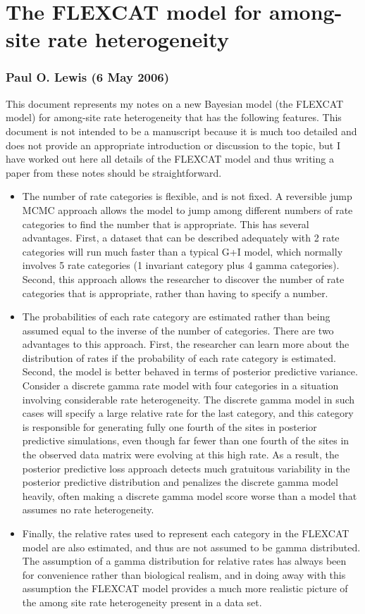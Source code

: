 \documentclass[12pt]{article}
\begin{document}
\section{The FLEXCAT model for among-site rate heterogeneity}
\subsubsection{Paul O. Lewis (6 May 2006)}

This document represents my notes on a new Bayesian model (the FLEXCAT model) for among-site rate heterogeneity that has the following features. This document is not intended to be a manuscript because it is much too detailed and does not provide an appropriate introduction or discussion to the topic, but I have worked out here all details of the FLEXCAT model and thus writing a paper from these notes should be straightforward.

\begin{itemize}
\item The number of rate categories is flexible, and is not fixed. A reversible jump MCMC approach allows the model to jump among different numbers of rate categories to find the number that is appropriate. This has several advantages. First, a dataset that can be described adequately with 2 rate categories will run much faster than a typical G+I model, which normally involves 5 rate categories (1 invariant category plus 4 gamma categories). Second, this approach allows the researcher to discover the number of rate categories that is appropriate, rather than having to specify a number.
\item The probabilities of each rate category are estimated rather than being assumed equal to the inverse of the number of categories. There are two advantages to this approach. First, the researcher can learn more about the distribution of rates if the probability of each rate category is estimated. Second, the model is better behaved in terms of posterior predictive variance. Consider a discrete gamma rate model with four categories in a situation involving considerable rate heterogeneity. The discrete gamma model in such cases will specify a large relative rate for the last category, and this category is responsible for generating fully one fourth of the sites in posterior predictive simulations, even though far fewer than one fourth of the sites in the observed data matrix were evolving at this high rate. As a result, the posterior predictive loss approach detects much gratuitous variability in the posterior predictive distribution and penalizes the discrete gamma model heavily, often making a discrete gamma model score worse than a model that assumes no rate heterogeneity.
\item Finally, the relative rates used to represent each category in the FLEXCAT model are also estimated, and thus are not assumed to be gamma distributed. The assumption of a gamma distribution for relative rates has always been for convenience rather than biological realism, and in doing away with this assumption the FLEXCAT model provides a much more realistic picture of the among site rate heterogeneity present in a data set.
\end{itemize}
\end{document}
